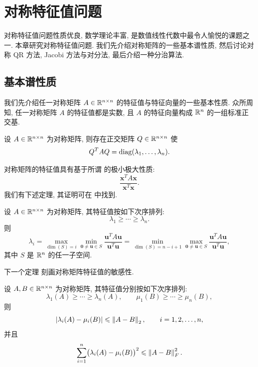 \chapter{对称特征值问题}
\label{ch:sym-eig}

对称特征值问题性质优良, 数学理论丰富, 是数值线性代数中最令人愉悦的课题之一. 本章研究对称特征值问题. 我们先介绍对称矩阵的一些基本谱性质, 然后讨论对称 QR 方法, Jacobi 方法与对分法, 最后介绍一种分治算法.

\section{基本谱性质}
\label{sec:8-1}

我们先介绍任一对称矩阵 $A\in\mathbb{R}^{n\times n}$ 的特征值与特征向量的一些基本性质. 众所周知, 任一对称矩阵 $A$ 的特征值都是实数, 且 $A$ 的特征向量构成 $\mathbb{R}^n$ 的一组标准正交基.

\begin{theorem}
\label{thm:8-1}
设 $A\in\mathbb{R}^{n\times n}$ 为对称矩阵, 则存在正交矩阵 $Q\in\mathbb{R}^{n\times n}$ 使
\[
  Q^TAQ=\operatorname{diag}(\lambda_1,\ldots,\lambda_n).
\]
\end{theorem}

对称矩阵的特征值具有基于所谓 的极小极大性质:
\[
  \frac{\mathbf{x}^TA\mathbf{x}}{\mathbf{x}^T\mathbf{x}}.
\]
我们有下述定理, 其证明可在 \cite{src:32} 中找到.

\begin{theorem}
\label{thm:8-2}
设 $A\in\mathbb{R}^{n\times n}$ 为对称矩阵, 其特征值按如下次序排列:
\[
  \lambda_1\geqslant\cdots\geqslant\lambda_n.
\]
则
\[
  \lambda_i=\max_{\dim(S)=i}\min_{\mathbf{0}\neq\mathbf{u}\in S}
  \frac{\mathbf{u}^TA\mathbf{u}}{\mathbf{u}^T\mathbf{u}}
  =\min_{\dim(S)=n-i+1}\max_{\mathbf{0}\neq\mathbf{u}\in S}
  \frac{\mathbf{u}^TA\mathbf{u}}{\mathbf{u}^T\mathbf{u}},
\]
其中 $S$ 是 $\mathbb{R}^n$ 的任一子空间.
\end{theorem}

下一个定理 \cite{src:95} 刻画对称矩阵特征值的敏感性.

\begin{theorem}
\label{thm:8-3}
设 $A,B\in\mathbb{R}^{n\times n}$ 为对称矩阵, 其特征值分别按如下次序排列:
\[
  \lambda_1(A)\geqslant\cdots\geqslant\lambda_n(A),
  \qquad
  \mu_1(B)\geqslant\cdots\geqslant\mu_n(B),
\]
则
\[
  \left|\lambda_i(A)-\mu_i(B)\right|\leqslant\left\|A-B\right\|_2,
  \qquad i=1,2,\ldots,n,
\]
并且
\[
  \sum_{i=1}^{n}\bigl(\lambda_i(A)-\mu_i(B)\bigr)^2\leqslant\left\|A-B\right\|_F^2.
\]
\end{theorem}

